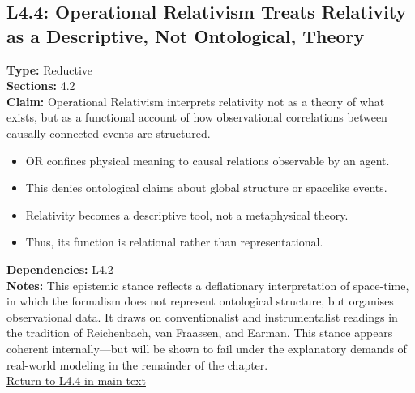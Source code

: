 \documentclass[12pt]{book}
\newcommand{\returnlink}[1]{\hyperref[logic:#1]{Return to #1 in main text}\xspace}
\begin{document}
\subsection*{L4.4: Operational Relativism Treats Relativity as a Descriptive, Not Ontological, Theory}\label{appendix:L4.4}
\textbf{Type:} Reductive \\
\textbf{Sections:} 4.2 \\
\textbf{Claim:} Operational Relativism interprets relativity not as a theory of what exists, but as a functional account of how observational correlations between causally connected events are structured.
\begin{itemize}
  \item OR confines physical meaning to causal relations observable by an agent.
  \item This denies ontological claims about global structure or spacelike events.
  \item Relativity becomes a descriptive tool, not a metaphysical theory.
  \item Thus, its function is relational rather than representational.
\end{itemize}
\textbf{Dependencies:} L4.2 \\
\textbf{Notes:} This epistemic stance reflects a deflationary interpretation of space-time, in which the formalism does not represent ontological structure, but organises observational data. It draws on conventionalist and instrumentalist readings in the tradition of Reichenbach, van Fraassen, and Earman. This stance appears coherent internally---but will be shown to fail under the explanatory demands of real-world modeling in the remainder of the chapter. \\
\returnlink{L4.4}
\end{document}
